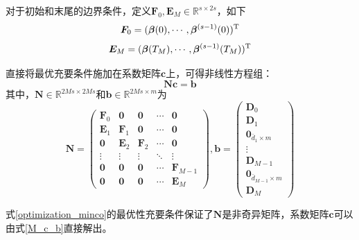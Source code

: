 对于初始和末尾的边界条件，定义$\boldsymbol{F}_0, \boldsymbol{E}_M \in \mathbb{R}^{s\times 2s}$，如下
\begin{equation}
    \boldsymbol{F}_0 = (\boldsymbol{\beta}(0),\cdots,\boldsymbol{\beta}^{(s-1)}(0)){\rm{^T}}
\end{equation}
\begin{equation}
    \boldsymbol{E}_M = (\boldsymbol{\beta}(T_M),\cdots,\boldsymbol{\beta}^{(s-1)}(T_M)){\rm{^T}}
\end{equation}

直接将最优充要条件施加在系数矩阵$\boldsymbol{c}$上，可得非线性方程组：
\begin{equation}\label{M_c_b}
    \boldsymbol{Nc} = \boldsymbol{b}
\end{equation}
其中，$\boldsymbol{N}\in\mathbb{R}^{2Ms \times 2Ms}$和$\boldsymbol{b} \in \mathbb{R}^{2Ms \times m}$为
\begin{equation}\label{Mb}
    \boldsymbol{N} = \left( {\begin{array}{*{20}{c}}
        {\boldsymbol{F}_0}&{\boldsymbol{0}}&{\boldsymbol{0}}&{\cdots}&{\boldsymbol{0}}\\
        {\boldsymbol{E}_1}&{\boldsymbol{F}_1}&{\boldsymbol{0}}&{\cdots}&{\boldsymbol{0}}\\
        {\boldsymbol{0}}&{\boldsymbol{E}_2}&{\boldsymbol{F}_2}&{\cdots}&{\boldsymbol{0}}\\
        {\vdots}&{\vdots}&{\vdots}&{\ddots}&{\vdots}\\
        {\boldsymbol{0}}&{\boldsymbol{0}}&{\boldsymbol{0}}&{\cdots}&{\boldsymbol{F}_{M-1}}\\
        {\boldsymbol{0}}&{\boldsymbol{0}}&{\boldsymbol{0}}&{\cdots}&{\boldsymbol{E}_{M}}
        \end{array}} \right), 
        \boldsymbol{b} = \left({\begin{array}{*{20}{c}}
            \boldsymbol{D}_0\\
            \boldsymbol{D}_1\\
            \boldsymbol{0}_{\bar{d}_1 \times m}\\
            \vdots\\
            \boldsymbol{D}_{M-1}\\
            \boldsymbol{0}_{\bar{d}_{M-1}\times m}\\
            \boldsymbol{D}_M
        \end{array}} \right) 
\end{equation}

式\ref{optimization_minco}的最优性充要条件保证了$\boldsymbol{N}$是非奇异矩阵，系数矩阵$\boldsymbol{c}$可以由式\ref{M_c_b}直接解出。

